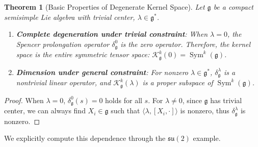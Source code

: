 \documentclass[a4paper,12pt]{extarticle}
\theoremstyle{plain}
\newtheorem{theorem}{Theorem}[section]
\theoremstyle{definition}
\begin{document}
\begin{theorem}[Basic Properties of Degenerate Kernel Space]
\label{thm:kernel_properties}
Let $\mathfrak{g}$ be a compact semisimple Lie algebra with trivial center, $\lambda \in \mathfrak{g}^*$.
\begin{enumerate}
    \item \textbf{Complete degeneration under trivial constraint}: When $\lambda=0$, the Spencer prolongation operator $\delta_{\mathfrak{g}}^{0}$ is the zero operator. Therefore, the kernel space is the entire symmetric tensor space: $\mathcal{K}_{\mathfrak{g}}^{k}(0) = \operatorname{Sym}^k(\mathfrak{g})$.
    \item \textbf{Dimension under general constraint}: For nonzero $\lambda \in \mathfrak{g}^*$, $\delta_{\mathfrak{g}}^{\lambda}$ is a nontrivial linear operator, and $\mathcal{K}_{\mathfrak{g}}^{k}(\lambda)$ is a proper subspace of $\operatorname{Sym}^k(\mathfrak{g})$.
\end{enumerate}
\end{theorem}
\begin{proof}
When $\lambda=0$, $\delta_{\mathfrak{g}}^{0}(s)=0$ holds for all $s$. For $\lambda \neq 0$, since $\mathfrak{g}$ has trivial center, we can always find $X_i \in \mathfrak{g}$ such that $\langle\lambda, [X_i, \cdot]\rangle$ is nonzero, thus $\delta_{\mathfrak{g}}^{\lambda}$ is nonzero.
\end{proof}

We explicitly compute this dependence through the $\mathfrak{su}(2)$ example.
\end{document}
